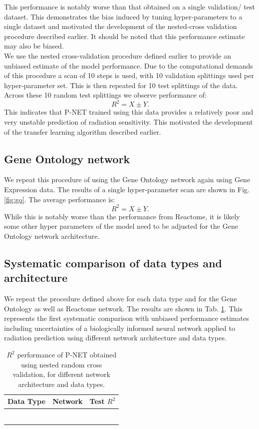 \documentclass[NOTE, disdraft=true, UKenglish]{\DISCDTLATEXPATH UCLCDTDISdoc}
\begin{document}
This performance is notably worse than that obtained on a single validation/ test dataset. This demonstrates the bias induced by tuning hyper-parameters to a single dataset and motivated the development of the nested-cross validation procedure described earlier. It should be noted that this performance estimate may also be biased.
\\ \indent We use the nested cross-validation procedure defined earlier to provide an unbiased estimate of the model performance. Due to the computational demands of this procedure a scan of 10 steps is used, with 10 validation splittings used per hyper-parameter set. This is then repeated for 10 test splittings of the data. Across these 10 random test splittings we observe performance of:
\begin{equation}
    R^2=X \pm Y.
\end{equation}
This indicates that P-NET trained using this data provides a relatively poor and very unstable prediction of radiation sensitivity. This motivated the development of the transfer learning algorithm described earlier.
\subsection{Gene Ontology network}
We repeat this procedure of using the Gene Ontology network again using Gene Expression data. The results of a single hyper-parameter scan are shown in Fig. \ref{fig:go}. The average performance is:
\begin{equation}
    R^2=X\pm Y.
\end{equation}
While this is notably worse than the performance from Reactome, it is likely some other hyper parameters of the model need to be adjusted for the Gene Ontology network architecture.
\subsection{Systematic comparison of data types and architecture}
We repeat the procedure defined above for each data type and for the Gene Ontology as well as Reactome network. The results are shown in Tab. \ref{tab:perf}. This represents the first systematic comparison with unbiased performance estimates including uncertainties of a biologically informed neural network applied to radiation prediction using different network architecture and data types.
\begin{table}[]
    \centering
 \caption{$R^2$ performance of P-NET obtained using nested random cross validation, for different network architecture and data types.}

    \begin{tabular}{c|c|c}
     Data Type    & Network & Test $R^2$  \\ \hline
     \\
     \\
     \\
     \\
     \\
         & 
    \end{tabular}
 
    \label{tab:perf}
\end{table}
\\
\end{document}
